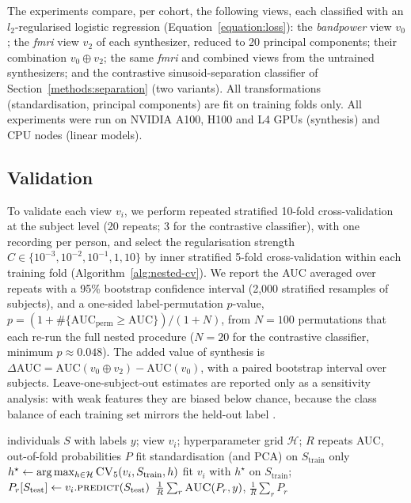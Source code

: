 \documentclass{article}
\begin{document}
The experiments compare, per cohort, the following views, each classified with an $l_2$-regularised logistic regression (Equation~\ref{equation:loss}): the \textit{bandpower} view $v_0$; the \textit{fmri} view $v_2$ of each synthesizer, reduced to 20 principal components; their combination $v_0 \oplus v_2$; the same \textit{fmri} and combined views from the untrained synthesizers; and the contrastive sinusoid-separation classifier of Section~\ref{methods:separation} (two variants). All transformations (standardisation, principal components) are fit on training folds only. All experiments were run on NVIDIA A100, H100 and L4 GPUs (synthesis) and CPU nodes (linear models).

\subsection{Validation}\label{section:validation}

To validate each view $v_i$, we perform repeated stratified 10-fold cross-validation at the subject level (20 repeats; 3 for the contrastive classifier), with one recording per person, and select the regularisation strength $C \in \{10^{-3},10^{-2},10^{-1},1,10\}$ by inner stratified 5-fold cross-validation within each training fold (Algorithm~\ref{alg:nested-cv}). We report the AUC averaged over repeats with a 95\% bootstrap confidence interval (2,000 stratified resamples of subjects), and a one-sided label-permutation $p$-value, $p=(1+\#\{\mathrm{AUC}_{\mathrm{perm}}\geq\mathrm{AUC}\})/(1+N)$, from $N=100$ permutations that each re-run the full nested procedure ($N=20$ for the contrastive classifier, minimum $p\approx0.048$). The added value of synthesis is $\Delta\mathrm{AUC}=\mathrm{AUC}(v_0\oplus v_2)-\mathrm{AUC}(v_0)$, with a paired bootstrap interval over subjects. Leave-one-subject-out estimates are reported only as a sensitivity analysis: with weak features they are biased below chance, because the class balance of each training set mirrors the held-out label \cite{varoquaux2018}.

\begin{algorithm}[t]
\caption{Nested repeated cross-validation for view $v_i$}
\label{alg:nested-cv}
\begin{algorithmic}[1]
\Require individuals $S$ with labels $y$; view $v_i$; hyperparameter grid $\mathcal{H}$; $R$ repeats
\Ensure AUC, out-of-fold probabilities $P$
     
        \State fit standardisation (and PCA) on $S_{\text{train}}$ only
        \State $h^\star \gets \arg\max_{h \in \mathcal{H}} \textsc{CV}_5(v_i, S_{\text{train}}, h)$ 
        \State fit $v_i$ with $h^\star$ on $S_{\text{train}}$; $P_r[S_{\text{test}}] \gets v_i.\textsc{predict}(S_{\text{test}})$
    \EndFor
\EndFor
\State \Return $\frac{1}{R}\sum_r \textsc{AUC}(P_r, y)$, $\frac{1}{R}\sum_r P_r$
\end{algorithmic}
\end{algorithm}
\end{document}
